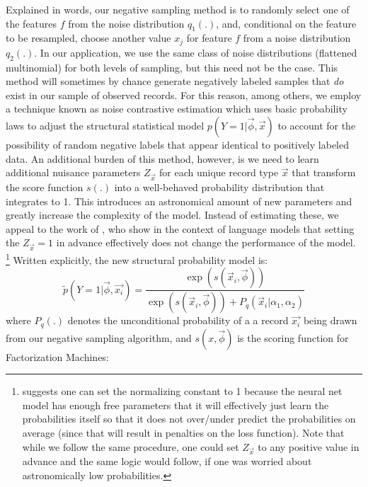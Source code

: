 \documentclass{article} %
\renewcommand{\cite}[1]{\citep{#1}}
\begin{document}
Explained in words, our negative sampling method is to randomly select one of the features $f$ from the noise distribution $q_1(.)$, and, conditional on the feature to be resampled, choose another value $x_j$ for feature $f$ from a noise distribution $q_2(.)$.
In our application, we use the same class of noise distributions (flattened multinomial) for both levels of sampling, but this need not be the case.
This method will sometimes by chance generate negatively labeled samples that \textit{do} exist in our sample of observed records.
For this reason, among others, we employ a technique known as noise contrastive estimation \cite{nce} which uses basic probability laws to adjust the structural statistical model $p(Y=1|\vec{\phi},\vec{x})$ to account for the possibility of random negative labels that appear identical to positively labeled data.
An additional burden of this method, however, is we need to learn additional nuisance parameters $Z_{\vec{x}}$ for each unique record type $\vec{x}$ that transform the score function $s(.)$ into a well-behaved probability distribution that integrates to 1.
This introduces an astronomical amount of new parameters and greatly increase the complexity of the model.
Instead of estimating these, we appeal to the work of \cite{fastnnlang},
who show in the context of language models that setting the $Z_{\vec{x}}=1$ in advance effectively does not change the performance of the model.
\footnote{\cite{fastnnlang} suggests one can set the normalizing constant to 1 because the neural net model has enough free parameters that it will effectively just learn the probabilities itself so that it does not over/under predict the probabilities on average (since that will result in penalties on the loss function). Note that while we follow the same procedure, one could set $Z_{\vec{x}}$ to any positive value in advance and the same logic would follow, if one was worried about astronomically low probabilities.}
Written explicitly, the new structural probability model is:
\[\tilde p(Y=1|\vec{\phi},\vec{x_i}) = \frac{\exp(s(\vec{x}_i,\vec{\phi}))}{\exp(s(\vec{x}_i,\vec{\phi})) + P_{q}(\vec{x}_i| \alpha_1,\alpha_2)}\]
where $P_q(.)$ denotes the unconditional probability of a a record $\vec{x_i}$ being drawn from our negative sampling algorithm, and  $s(x,\vec{\phi})$ is the scoring function for Factorization Machines:
\end{document}
